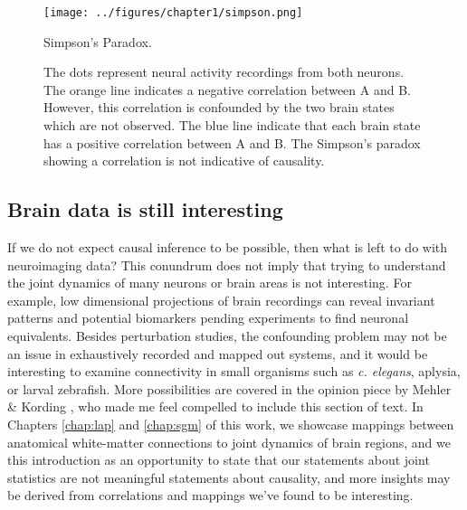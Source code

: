 \begin{figure}[htbp]
	\centering
	\texttt{[image: ../figures/chapter1/simpson.png]}
	\caption{Simpson's Paradox.}
	\caption*{The dots represent neural activity recordings from both neurons. The orange line indicates a negative correlation between A and B. However, this correlation is confounded by the two brain states which are not observed. The blue line indicate that each brain state has a positive correlation between A and B. The Simpson's paradox showing a correlation is not indicative of causality.}
	\label{fig:simpson}
\end{figure}

\subsection{Brain data is still interesting}
If we do not expect causal inference to be possible, then what is left to do with neuroimaging data? This conundrum does not imply that trying to understand the joint dynamics of many neurons or brain areas is not interesting. For example, low dimensional projections of brain recordings can reveal invariant patterns \cite{bruno_spiral_2017,gordon_precision_2017} and potential biomarkers \cite{marceau_biomarker_2018,desowska_dynamics_2019,beijers_data-driven_2019} pending experiments to find neuronal equivalents. Besides perturbation studies, the confounding problem may not be an issue in exhaustively recorded and mapped out systems, and it would be interesting to examine connectivity in small organisms such as \emph{c. elegans}, aplysia, or larval zebrafish. More possibilities are covered in the opinion piece by Mehler \& Kording \cite{mehler_lure_2020}, who made me feel compelled to include this section of text.  In Chapters \ref{chap:lap} and \ref{chap:sgm} of this work, we showcase mappings between anatomical white-matter connections to joint dynamics of brain regions, and we this introduction as an opportunity to state that our statements about joint statistics are not meaningful statements about causality, and more insights may be derived from correlations and mappings we've found to be interesting.


